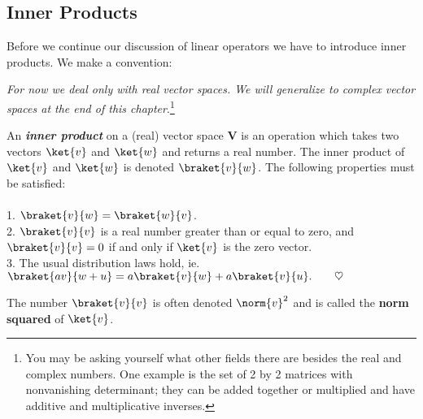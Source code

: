 \subsection{Inner Products}
Before we continue our discussion of linear operators we have to introduce inner products.  We make a convention:

\textit{For now we deal only with real vector spaces.  We will generalize to complex vector spaces at the end of this chapter}.\footnote{You may be asking yourself what other fields there are besides the real and complex numbers.  One example is the set of 2 by 2 matrices with nonvanishing determinant; they can be added together or multiplied and have additive and multiplicative inverses.}
\begin{definition}
An \emph{\textbf{inner product}} on a (real) vector space \textbf{V} is an operation which takes two vectors $\ket{v}$ and $\ket{w}$ and returns a real number. The inner product of $\ket{v}$ and $\ket{w}$ is denoted $\braket{v}{w}$.  The following properties must be satisfied:\\
\\
1. $\braket{v}{w} = \braket{w}{v}$.\\
2. $\braket{v}{v}$ is a real number greater than or equal to zero, and $\braket{v}{v} = 0$ if and only if $\ket{v}$ is the zero vector.\\
3. The usual distribution laws hold, ie. $\braket{av}{w + u} = a\braket{v}{w} + a\braket{v}{u}. \qquad \heartsuit$
\end{definition}
The number $\braket{v}{v}$ is often denoted $\norm{v}^2$ and is called the \textbf{norm squared} of $\ket{v}$.

